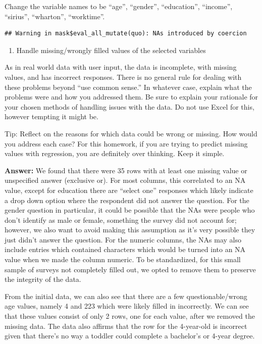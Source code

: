\documentclass[
]{article}
\providecommand{\tightlist}{%
  \setlength{\itemsep}{0pt}\setlength{\parskip}{0pt}}
\begin{document}
Change the variable names to be ``age'', ``gender'', ``education'',
``income'', ``sirius'', ``wharton'', ``worktime''.

\begin{verbatim}
## Warning in mask$eval_all_mutate(quo): NAs introduced by coercion
\end{verbatim}

\begin{enumerate}
\def\labelenumi{\roman{enumi}.}
\setcounter{enumi}{1}
\tightlist
\item
  Handle missing/wrongly filled values of the selected variables
\end{enumerate}

As in real world data with user input, the data is incomplete, with
missing values, and has incorrect responses. There is no general rule
for dealing with these problems beyond ``use common sense.'' In whatever
case, explain what the problems were and how you addressed them. Be sure
to explain your rationale for your chosen methods of handling issues
with the data. Do not use Excel for this, however tempting it might be.

Tip: Reflect on the reasons for which data could be wrong or missing.
How would you address each case? For this homework, if you are trying to
predict missing values with regression, you are definitely over
thinking. Keep it simple.

\textbf{Answer:} We found that there were 35 rows with at least one
missing value or unspecified answer (exclusive or). For most columns,
this correlated to an NA value, except for education there are ``select
one'' responses which likely indicate a drop down option where the
respondent did not answer the question. For the gender question in
particular, it could be possible that the NAs were people who don't
identify as male or female, something the survey did not account for;
however, we also want to avoid making this assumption as it's very
possible they just didn't answer the question. For the numeric columns,
the NAs may also include entries which contained characters which would
be turned into an NA value when we made the column numeric. To be
standardized, for this small sample of surveys not completely filled
out, we opted to remove them to preserve the integrity of the data.

From the initial data, we can also see that there are a few
questionable/wrong age values, namely 4 and 223 which were likely filled
in incorrectly. We can see that these values consist of only 2 rows, one
for each value, after we removed the missing data. The data also affirms
that the row for the 4-year-old is incorrect given that there's no way a
toddler could complete a bachelor's or 4-year degree.
\end{document}
